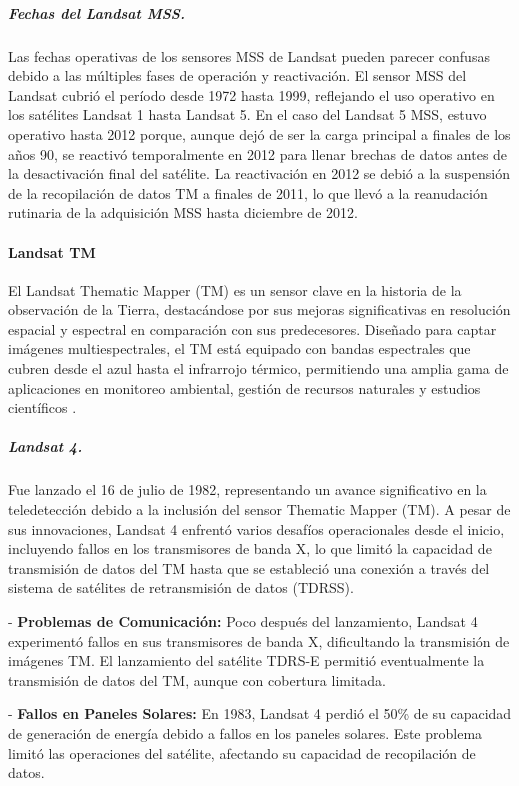                     \subparagraph{Fechas del Landsat MSS.}
                        Las fechas operativas de los sensores MSS de Landsat pueden parecer confusas debido a las múltiples fases de operación y reactivación. El sensor MSS del Landsat cubrió el período desde 1972 hasta 1999, reflejando el uso operativo en los satélites Landsat 1 hasta Landsat 5. En el caso del Landsat 5 MSS, estuvo operativo hasta 2012 porque, aunque dejó de ser la carga principal a finales de los años 90, se reactivó temporalmente en 2012 para llenar brechas de datos antes de la desactivación final del satélite. La reactivación en 2012 se debió a la suspensión de la recopilación de datos TM a finales de 2011, lo que llevó a la reanudación rutinaria de la adquisición MSS hasta diciembre de 2012.

                \paragraph{Landsat TM}
                    El Landsat Thematic Mapper (TM) es un sensor clave en la historia de la observación de la Tierra, destacándose por sus mejoras significativas en resolución espacial y espectral en comparación con sus predecesores. Diseñado para captar imágenes multiespectrales, el TM está equipado con bandas espectrales que cubren desde el azul hasta el infrarrojo térmico, permitiendo una amplia gama de aplicaciones en monitoreo ambiental, gestión de recursos naturales y estudios científicos \autocite{landsat_legacy}.

                    \subparagraph{Landsat 4.}
                        Fue lanzado el 16 de julio de 1982, representando un avance significativo en la teledetección debido a la inclusión del sensor Thematic Mapper (TM). A pesar de sus innovaciones, Landsat 4 enfrentó varios desafíos operacionales desde el inicio, incluyendo fallos en los transmisores de banda X, lo que limitó la capacidad de transmisión de datos del TM hasta que se estableció una conexión a través del sistema de satélites de retransmisión de datos (TDRSS).

                        - \textbf{Problemas de Comunicación:} Poco después del lanzamiento, Landsat 4 experimentó fallos en sus transmisores de banda X, dificultando la transmisión de imágenes TM. El lanzamiento del satélite TDRS-E permitió eventualmente la transmisión de datos del TM, aunque con cobertura limitada.

                        - \textbf{Fallos en Paneles Solares:} En 1983, Landsat 4 perdió el 50\% de su capacidad de generación de energía debido a fallos en los paneles solares. Este problema limitó las operaciones del satélite, afectando su capacidad de recopilación de datos.

